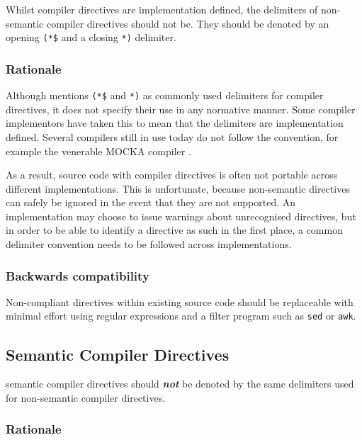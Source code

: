 \documentclass[10pt,a4paper]{article}
\renewcommand{\emph}[1]{\textbf{\textit{#1}}}
\begin{document}
Whilst \glspl{compiler directive} are implementation defined, the delimiters of
\glspl{non-semantic compiler directive} should not be. They should be denoted
by an opening \verb|(*$| and a closing \verb|*)| delimiter.

\subsubsection{Rationale}

Although \cite{Wirth88} mentions \verb|(*$| and \verb|*)| as commonly used
delimiters for \glspl{compiler directive}, it does not specify their use in any
normative manner. Some compiler implementors have taken this to mean that the
delimiters are implementation defined. Several compilers still in use today do
not follow the convention, for example the venerable MOCKA compiler \cite{MOCKA}.

As a result, source code with \glspl{compiler directive} is often not portable
across different implementations. This is unfortunate, because non-semantic
directives can safely be ignored in the event that they are not supported. An
implementation may choose to issue warnings about unrecognised directives, but
in order to be able to identify a directive as such in the first place, a
common delimiter convention needs to be followed across implementations.

\subsubsection{Backwards compatibility}

Non-compliant directives within existing source code should be replaceable with
minimal effort using regular expressions and a filter program such as
\verb|sed| or \verb|awk|. 


\subsection{Semantic Compiler Directives}

\Glspl{semantic compiler directive} should \emph{not} be denoted by the same
delimiters used for \glspl{non-semantic compiler directive}.

\subsubsection{Rationale}
\end{document}
